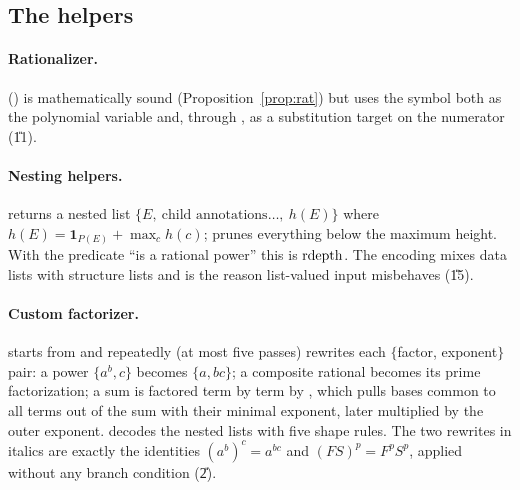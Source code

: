 \subsection{The helpers}
\paragraph{Rationalizer.}  () is
mathematically sound (Proposition~\ref{prop:rat}) but uses the symbol 
both as the polynomial variable and, through , as a
substitution target on the numerator (\U{11}).

\paragraph{Nesting helpers.}  returns a nested list
$\{E,\ \text{child annotations}\ldots,\ h(E)\}$ where
$h(E)=\mathbf 1_{P(E)}+\max_c h(c)$;  prunes everything below
the maximum height. With the predicate ``is a rational power'' this is
$\operatorname{rdepth}$. The encoding mixes data lists with structure lists and is the reason
list-valued input misbehaves (\U{15}).

\paragraph{Custom factorizer.}  starts from 
and repeatedly (at most five passes) rewrites each $\{$factor, exponent$\}$ pair:
a power $\{a^b,c\}$ becomes $\{a,bc\}$; a composite rational becomes its prime
factorization; a sum is factored term by term by , which pulls
bases common to all terms out of the sum with their minimal exponent, later
multiplied by the outer exponent.  decodes the nested lists with
five shape rules. The two rewrites in italics are exactly the identities
$(a^b)^c=a^{bc}$ and $(FS)^p=F^pS^p$, applied without any branch condition
(\U{2}).
